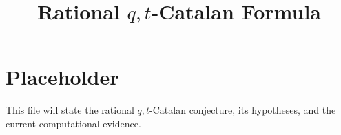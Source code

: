 \documentclass{article}
\title{Rational \texorpdfstring{$q,t$}{qt}-Catalan Formula}
\author{}
\date{}
\begin{document}
\maketitle

\section{Placeholder}

This file will state the rational \(q,t\)-Catalan conjecture, its hypotheses,
and the current computational evidence.
\end{document}
